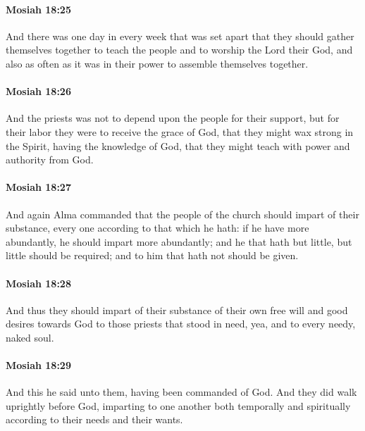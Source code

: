 		\paragraph{Mosiah 18:25} %
			\label{MOSIAH-18-25}

			And there was one day in every week that was set apart
			that they should gather themselves together to teach the people
			and to worship the Lord their God,
			and also as often as it was in their power to assemble themselves together.

		\paragraph{Mosiah 18:26} %
			\label{MOSIAH-18-26}

			And the priests was not to depend upon the people for their support,
			but for their labor they were to receive the grace of God,
			that they might wax strong in the Spirit,
			having the knowledge of God,
			that they might teach with power and authority from God.

		\paragraph{Mosiah 18:27} %
			\label{MOSIAH-18-27}

			And again Alma commanded
			that the people of the church should impart of their substance,
			every one according to that which he hath:
			if he have more abundantly, he should impart more abundantly;
			and he that hath but little, but little should be required;
			and to him that hath not should be given.

		\paragraph{Mosiah 18:28} %
			\label{MOSIAH-18-28}

			And thus they should impart of their substance
			of their own free will and good desires towards God
			to those priests that stood in need,
			yea, and to every needy, naked soul.

		\paragraph{Mosiah 18:29} %
			\label{MOSIAH-18-29}

			And this he said unto them,
			having been commanded of God.
			And they did walk uprightly before God,
			imparting to one another both temporally and spiritually
			according to their needs and their wants.

